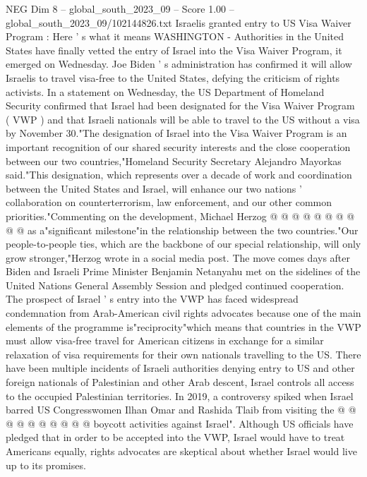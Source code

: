 \begin{textsample}{NEG Dim 8 – global\_south\_2023\_09 – Score 1.00 – global\_south\_2023\_09/102144826.txt}  \label{ex:f8_neg_005}
Israelis granted entry to US Visa Waiver Program : Here ' s what it means WASHINGTON - Authorities in the United States have finally vetted the entry of Israel into the Visa Waiver Program, it emerged on Wednesday.
Joe Biden ' s administration has confirmed it will allow Israelis to travel visa-free to the United States, defying the criticism of rights activists.
In a statement on Wednesday, the US Department of Homeland Security confirmed that Israel had been designated for the Visa Waiver Program ( VWP ) and that Israeli nationals will be able to travel to the US without a visa by November 30."The designation of Israel into the Visa Waiver Program is an important recognition of our shared security interests and the close cooperation between our two countries,"Homeland Security Secretary Alejandro Mayorkas said."This designation, which represents over a decade of work and coordination between the United States and Israel, will enhance our two nations ' collaboration on counterterrorism, law enforcement, and our other common priorities."Commenting on the development, Michael Herzog @ @ @ @ @ @ @ @ @ @ as a"significant milestone"in the relationship between the two countries."Our people-to-people ties, which are the backbone of our special relationship, will only grow stronger,"Herzog wrote in a social media post.
The move comes days after Biden and Israeli Prime Minister Benjamin Netanyahu met on the sidelines of the United Nations General Assembly Session and pledged continued cooperation.
The prospect of Israel ' s entry into the VWP has faced widespread condemnation from Arab-American civil rights advocates because one of the main elements of the programme is"reciprocity"which means that countries in the VWP must allow visa-free travel for American citizens in exchange for a similar relaxation of visa requirements for their own nationals travelling to the US.
There have been multiple incidents of Israeli authorities denying entry to US and other foreign nationals of Palestinian and other Arab descent, Israel controls all access to the occupied Palestinian territories.
In 2019, a controversy spiked when Israel barred US Congresswomen Ilhan Omar and Rashida Tlaib from visiting the @ @ @ @ @ @ @ @ @ @ boycott activities against Israel".
Although US officials have pledged that in order to be accepted into the VWP, Israel would have to treat Americans equally, rights advocates are skeptical about whether Israel would live up to its promises.

\end{textsample}

